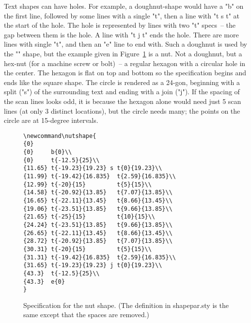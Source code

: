 \documentclass[draft]{article}
\makeatletter
\DeclareRobustCommand{\_}{%
  \ifmmode \nfss@text{\textunderscore}\else \BreakableUnderscore \fi}
\makeatother
\begin{document}
Text shapes can have holes.  For example, a doughnut-shape would have a "b"
on the first line, followed by some lines with a single "t",  then a line with
"t s t" at the start of the hole. The hole is represented by lines with two
"t" specs~-- the gap between them is the hole.  A line with  "t j t" ends the
hole.  There are more lines with single "t", and then an "e" line to end
with.  Such a doughnut is used by the "\CDlabel" shape, but the
example given in Figure~\ref{fig:nut} is a nut. Not a doughnut, but a hex-nut (for a
machine screw or bolt)~-- a regular hexagon with a circular hole in the center.
The hexagon is flat on top and bottom so the specification begins and
ends like the square shape. The circle is rendered as a 24-gon, beginning
with a split ("s") of the surrounding text and ending with a join ("j").
If the spacing of the scan lines looks odd, it is because the hexagon alone
would need just 5 scan lines (at only 3 distinct locations), but the circle
needs many; the points on the circle are at 15-degree intervals.
\begin{figure}[htbp]
\renewcommand{\baselinestretch}{.9}
\begin{verbatim}
\newcommand\nutshape{
{0}
{0}     b{0}\\
{0}     t{-12.5}{25}\\
{11.65} t{-19.23}{19.23} s t{0}{19.23}\\
{11.99} t{-19.42}{16.835}  t{2.59}{16.835}\\
{12.99} t{-20}{15}         t{5}{15}\\
{14.58} t{-20.92}{13.85}   t{7.07}{13.85}\\
{16.65} t{-22.11}{13.45}   t{8.66}{13.45}\\
{19.06} t{-23.51}{13.85}   t{9.66}{13.85}\\
{21.65} t{-25}{15}         t{10}{15}\\
{24.24} t{-23.51}{13.85}   t{9.66}{13.85}\\
{26.65} t{-22.11}{13.45}   t{8.66}{13.45}\\
{28.72} t{-20.92}{13.85}   t{7.07}{13.85}\\
{30.31} t{-20}{15}         t{5}{15}\\
{31.31} t{-19.42}{16.835}  t{2.59}{16.835}\\
{31.65} t{-19.23}{19.23} j t{0}{19.23}\\
{43.3}  t{-12.5}{25}\\
{43.3}  e{0}
}
\end{verbatim}
\vspace{-\topsep}
\caption{Specification for the nut shape.
(The definition in shapepar.sty is the same except that
the spaces are removed.)}
\label{fig:nut}
\end{figure}
\end{document}
